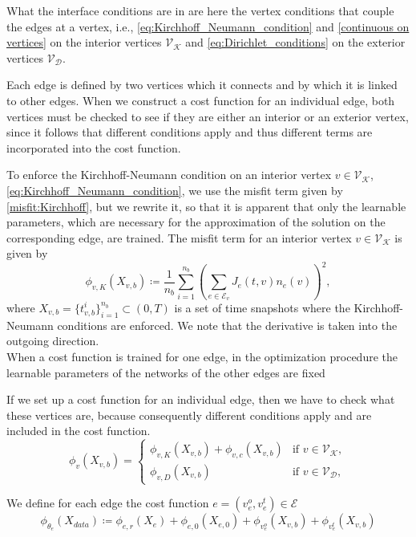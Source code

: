 What the interface conditions are in \cite{JagtapKharazmiKarniadakis:2020} are here the vertex conditions that couple the edges at a vertex, i.e., \cref{eq:Kirchhoff_Neumann_condition} and \cref{continuous on vertices} on the interior vertices $\mathcal{V}_\mathcal{K}$ and \cref{eq:Dirichlet_conditions} on the exterior vertices $\mathcal{V}_\mathcal{D}$. 

Each edge is defined by two vertices which it connects and by which it is linked to other edges. When we construct a cost function for an individual edge, both vertices must be checked to see if they are either an interior or an exterior vertex, since it follows that different conditions apply and thus different terms are incorporated into the cost function. 

To enforce the Kirchhoff-Neumann condition on an interior vertex $v \in \mathcal{V}_\mathcal{K}$, \cref{eq:Kirchhoff_Neumann_condition}, we use the misfit term given by \cref{misfit:Kirchhoff}, but we rewrite it, so that it is apparent that only the learnable parameters, which are necessary for the approximation of the solution on the corresponding edge, are trained. The misfit term for an interior vertex $v \in \mathcal{V}_\mathcal{K}$ is given by
\begin{equation} 
    \label{misfit:Kirchhoff.}
    \phi_{v,K}  \left( X_{v,b} \right) \coloneqq \frac{1}{n_b} \sum_{i=1}^{n_b}  \left( \sum_{e\in \mathcal{E}_v} J_e(t,v) n_e (v) \right)^2, 
\end{equation} 
where $X_{v,b} = \{t_{v,b}^i\}_{i=1}^{n_b} \subset \left( 0,T \right)$ is a set of time snapshots where the Kirchhoff-Neumann conditions are enforced. We note that the derivative is taken into the outgoing direction. \\

When a cost function is trained for one edge, in the optimization procedure the learnable parameters of the networks of the other edges are fixed



If we set up a cost function for an individual edge, then we have to check what these vertices are, because consequently different conditions apply and are included in the cost function. 
\begin{equation}
    \label{vertex funcions}
    \phi_{v}(X_{v,b}) = \begin{cases} \phi_{v,K}  \left( X_{v,b} \right) +  \phi_{v,c}  \left( X_{v,b} \right)& \text{if } v \in \mathcal{V}_{\mathcal{K}}, \\ \phi_{v,D}  \left( X_{v,b} \right) & \text{if } v \in \mathcal{V}_{\mathcal{D}}, \end{cases}
\end{equation}


We define for each edge the cost function $e = (v^{o}_e, v^{t}_e) \in \mathcal{E}$
\begin{equation}
    \label{eq:cost:2}
    \phi_{\theta_e} \left( X_{data} \right) \coloneqq \phi_{e,r}  \left( X_e \right) + \phi_{e,0}  \left( X_{e,0} \right) + \phi_{v^{o}_e}(X_{v,b}) + \phi_{v^{t}_e}(X_{v,b})
\end{equation}